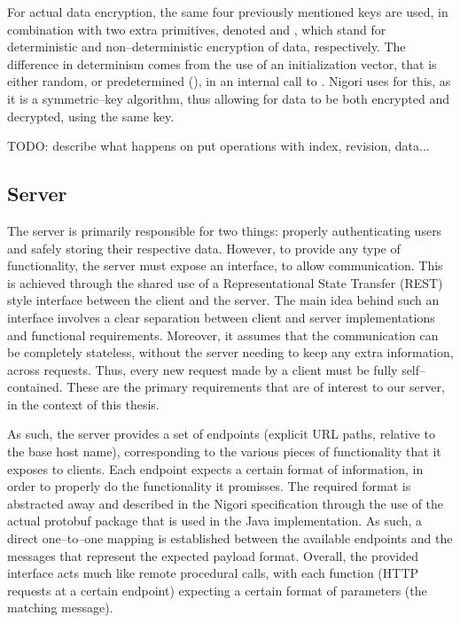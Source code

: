 For actual data encryption, the same four previously mentioned keys are used, in combination with two extra primitives, denoted  and , which stand for deterministic and non--deterministic encryption of data, respectively.
The difference in determinism comes from the use of an initialization vector, that is either random, or predetermined (), in an internal call to  \cite{AES}.
Nigori uses  for this, as it is a symmetric--key algorithm, thus allowing for data to be both encrypted and decrypted, using the same key.

TODO: describe what happens on put operations with index, revision, data...

\subsection{Server}
The server is primarily responsible for two things: properly authenticating users and safely storing their respective data.
However, to provide any type of functionality, the server must expose an interface, to allow communication.
This is achieved through the shared use of a Representational State Transfer (REST) \cite{REST} style interface between the client and the server.
The main idea behind such an interface involves a clear separation between client and server implementations and functional requirements.
Moreover, it assumes that the communication can be completely stateless, without the server needing to keep any extra information, across requests.
Thus, every new request made by a client must be fully self--contained.
These are the primary requirements that are of interest to our server, in the context of this thesis.

As such, the server provides a set of endpoints (explicit URL paths, relative to the base host name), corresponding to the various pieces of functionality that it exposes to clients.
Each endpoint expects a certain format of information, in order to properly do the functionality it promisses.
The required format is abstracted away and described in the Nigori specification through the use of the actual protobuf \cite{protobuf} package that is used in the Java implementation.
As such, a direct one--to--one mapping is established between the available endpoints and the messages that represent the expected payload format.
Overall, the provided interface acts much like remote procedural calls, with each function (HTTP requests at a certain endpoint) expecting a certain format of parameters (the matching message).

